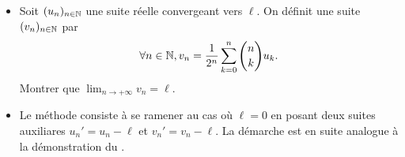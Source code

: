 \begin{itemize}
    \item Soit $(u_n)_{n \in \mathbb{N}}$ une suite réelle convergeant vers $\ell$. On définit une suite $(v_n)_{n \in \mathbb{N}}$ par 
    $$\forall n \in \mathbb{N}, v_n = \frac{1}{2^n} \sum_{k=0}^{n} \binom{n}{k} u_k.$$
    Montrer que $\displaystyle \lim_{n \rightarrow + \infty} v_n = \ell$.
    \item Le méthode consiste à se ramener au cas où $\ell = 0$ en posant deux suites auxiliares $u_n'=u_n - \ell$ et $v_n' = v_n - \ell$. La démarche est en suite analogue à la démonstration du .
\end{itemize}